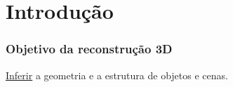 \section{Introdução}

\begin{frame}
  \frametitle{Objetivo da reconstrução 3D}

  \underline{Inferir} a geometria e a estrutura de objetos e cenas.

\end{frame}
